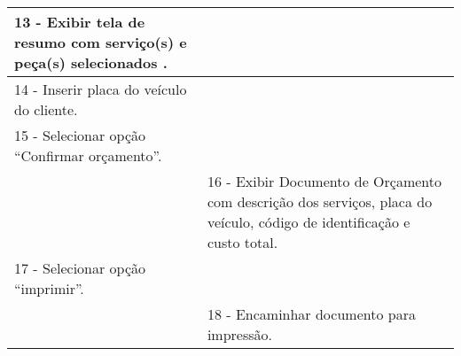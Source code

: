 \begin{tabular}{|p{7cm}|p{7cm}|}
		13 - Exibir tela de resumo com serviço(s) e peça(s) selecionados .
		\\ 
		\hline 
		
		
		14 - Inserir placa do veículo do cliente. 
		&  \\ 
		\hline 
		
		
		15 - Selecionar opção “Confirmar orçamento”.
		&  \\ 
		\hline 
		& 
		
		16 - Exibir Documento de Orçamento com descrição dos serviços, placa do veículo, código de identificação e  custo total.
		\\ 
		\hline 
		
		
		17 - Selecionar opção “imprimir”.
		&  \\ 
		\hline 
		& 
		
		18 - Encaminhar documento para impressão.
		\\ 
		\hline 
	\end{tabular} 
	\vspace{12px}	

